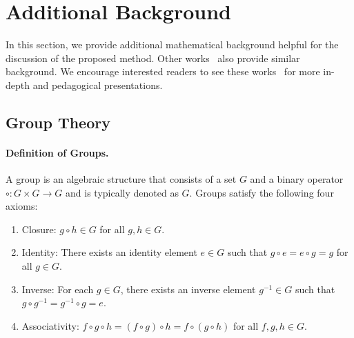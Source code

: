 \section{Additional Background}
\label{appendix:sec:additional_background}


In this section, we provide additional mathematical background helpful for the discussion of the proposed method.
Other works~\citep{tfn, 3dsteerable, kondor2018clebsch, cormorant, se3_transformer, segnn} also provide similar background.
We encourage interested readers to see these works~\citep{zee, Dresselhaus2007} for more in-depth and pedagogical presentations.

\subsection{Group Theory}
\label{appendix:subsec:group_theory}

\paragraph{Definition of Groups.}
A group is an algebraic structure that consists of a set $G$ and a binary operator $\circ: G \times G \rightarrow G$ and is typically denoted as $G$.
Groups satisfy the following four axioms:
\begin{enumerate}
    \item Closure: $g \circ h \in G$ for all $g, h \in G$.
    \item Identity: There exists an identity element $e \in G$ such that $g \circ e = e \circ g = g$ for all $g \in G$.
    \item Inverse: For each $g \in G$, there exists an inverse element $g^{-1} \in G$ such that $g \circ g^{-1} = g^{-1} \circ g = e$.
    \item Associativity: $f \circ g \circ h = (f \circ g) \circ h = f \circ (g \circ h )$ for all $f, g, h \in G$.
\end{enumerate}


